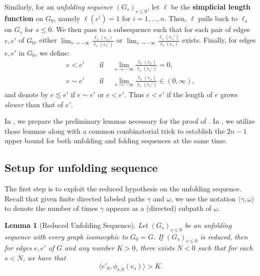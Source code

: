 \documentclass[11pt, letterpaper]{amsart}
\theoremstyle{plain}
\newtheorem{lemma}[theorem]{Lemma}
\theoremstyle{definition}
\begin{document}
Similarly, for an \emph{unfolding sequence} $(G_s)_{s\leq 0}$, let $\ell$ be the \textbf{simplicial length function} on
$G_0$, namely $\ell(e^i)=1$ for $i=1,\ldots, n$. Then, $\ell$ pulls back to
$\ell_s$ on $G_s$
for $s \le 0$.
We then pass to a subsequence
such that for each pair of edges $e, e'$ of $G_0$, either $\lim_{s \to
  -\infty}\frac{\ell_s(e_s)}{\ell_s(e_s')}$ or $\lim_{s \to -\infty}\frac{\ell_s(e_s')}{\ell_s(e_s)}$ exists.
Finally, for edges $e, e'$ in $G_0$, we define:
\begin{align*}
  e < e' \quad & \text{ if } \quad \lim_{s \to -\infty} \frac{\ell_s(e_s)}{\ell_s(e_s')} = 0, \\
  e \sim e' \quad & \text{ if } \quad \lim_{s \to -\infty} \frac{\ell_s(e_s)}{\ell_s(e_s')} \in (0,\infty),
\end{align*}
and denote by $e \lesssim e'$ if $e \sim e'$ or $e < e'$.
Thus $e<e'$ if the length of $e$ grows \emph{slower} than that of $e'$.

In , we prepare the preliminary lemmas necessary for the proof of . In , we utilize those lemmas along with a common combinatorial trick to establish the
$2n-1$ upper bound for both unfolding and folding sequences at the same time.

\subsection{Setup for unfolding sequence}
\label{ssec:UBsetup_unfolding}
The first step is to exploit the reduced hypothesis on the unfolding sequence. Recall that given finite directed labeled paths $\gamma$ and $\omega$, we use the notation $\langle \gamma, \omega \rangle$ to denote the number of times $\gamma$ appears as a (directed) subpath of $\omega$.

\begin{lemma}[Reduced Unfolding Sequence]\label{lem:reduced_unfolding}
  Let $(G_s)_{s \le 0}$ be an unfolding sequence with every graph
  isomorphic to $G_0 = G$. If $(G_s)_{s \le 0}$ is reduced, then for edges $e,e'$ of $G$ and any number
  $K>0$, there exists $N<0$ such that for each $s < N$, we have that
  \[
    \langle e'_0, \phi_{s,0}(e_s) \rangle > K.
  \] 
\end{lemma}
\end{document}
